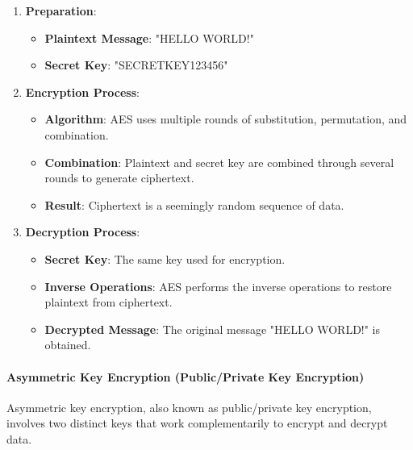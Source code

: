 \begin{enumerate}
    \item \textbf{Preparation}:
    \begin{itemize}
        \item \textbf{Plaintext Message}: "HELLO WORLD!"
        \item \textbf{Secret Key}: "SECRETKEY123456"
    \end{itemize}

    \item \textbf{Encryption Process}:
    \begin{itemize}
        \item \textbf{Algorithm}: AES uses multiple rounds of substitution, permutation, and combination.
        \item \textbf{Combination}: Plaintext and secret key are combined through several rounds to generate ciphertext.
        \item \textbf{Result}: Ciphertext is a seemingly random sequence of data.
    \end{itemize}

    \item \textbf{Decryption Process}:
    \begin{itemize}
        \item \textbf{Secret Key}: The same key used for encryption.
        \item \textbf{Inverse Operations}: AES performs the inverse operations to restore plaintext from ciphertext.
        \item \textbf{Decrypted Message}: The original message "HELLO WORLD!" is obtained.
    \end{itemize}
\end{enumerate}



\paragraph{Asymmetric Key Encryption (Public/Private Key Encryption)}

Asymmetric key encryption, also known as public/private key encryption, involves two distinct keys that work complementarily to encrypt and decrypt data.

